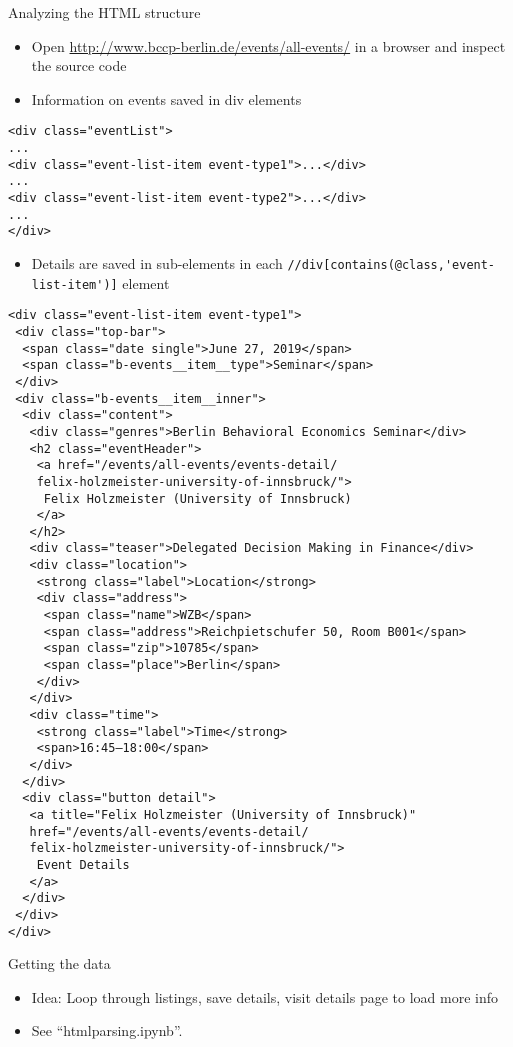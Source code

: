 \begin{frame}{Analyzing the HTML structure}
\begin{itemize}
	\item Open \url{http://www.bccp-berlin.de/events/all-events/} in a browser and inspect the source code
	\item Information on events saved in div elements
\end{itemize}
\begin{verbatim}
<div class="eventList">
...
<div class="event-list-item event-type1">...</div>
...
<div class="event-list-item event-type2">...</div>
...
</div>
\end{verbatim}

\framebreak

\begin{itemize}
	\item Details are saved in sub-elements in each \verb!//div[contains(@class,'event-list-item')]! element
\end{itemize}
\begin{verbatim}
<div class="event-list-item event-type1">
 <div class="top-bar">
  <span class="date single">June 27, 2019</span>
  <span class="b-events__item__type">Seminar</span>
 </div>
 <div class="b-events__item__inner">
  <div class="content">
   <div class="genres">Berlin Behavioral Economics Seminar</div>
   <h2 class="eventHeader">
    <a href="/events/all-events/events-detail/
    felix-holzmeister-university-of-innsbruck/">
     Felix Holzmeister (University of Innsbruck)
    </a>
   </h2>
   <div class="teaser">Delegated Decision Making in Finance</div>
   <div class="location">
    <strong class="label">Location</strong>
    <div class="address">
     <span class="name">WZB</span>
     <span class="address">Reichpietschufer 50, Room B001</span>
     <span class="zip">10785</span>
     <span class="place">Berlin</span>
    </div>
   </div>
   <div class="time">
    <strong class="label">Time</strong>
    <span>16:45–18:00</span>
   </div>
  </div>
  <div class="button detail">
   <a title="Felix Holzmeister (University of Innsbruck)" 
   href="/events/all-events/events-detail/
   felix-holzmeister-university-of-innsbruck/">
    Event Details
   </a>
  </div>
 </div>
</div>
\end{verbatim}
\end{frame}

\begin{frame}{Getting the data}
\begin{itemize}
	\item Idea: Loop through listings, save details, visit details page to load more info
	\item See ``htmlparsing.ipynb''.
\end{itemize}
\end{frame}

